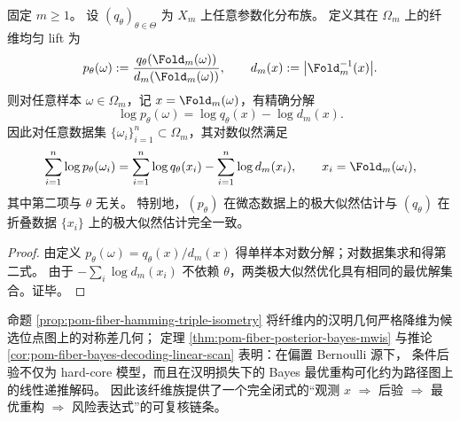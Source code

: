 \begin{proposition}\label{prop:pom-fiber-uniform-lift-mle-equivalence}
固定 \(m\ge 1\)。
设 \((q_\theta)_{\theta\in\Theta}\) 为 \(X_m\) 上任意参数化分布族。
定义其在 \(\Omega_m\) 上的纤维均匀 lift 为
\[
p_\theta(\omega):=\frac{q_\theta(\Fold_m(\omega))}{d_m(\Fold_m(\omega))},
\qquad
d_m(x):=\bigl|\Fold_m^{-1}(x)\bigr|.
\]
则对任意样本 \(\omega\in\Omega_m\)，记 \(x=\Fold_m(\omega)\)，有精确分解
\[
\log p_\theta(\omega)=\log q_\theta(x)-\log d_m(x).
\]
因此对任意数据集 \(\{\omega_i\}_{i=1}^n\subset\Omega_m\)，其对数似然满足
\[
\sum_{i=1}^n\log p_\theta(\omega_i)
=\sum_{i=1}^n\log q_\theta(x_i)-\sum_{i=1}^n\log d_m(x_i),
\qquad x_i=\Fold_m(\omega_i),
\]
其中第二项与 \(\theta\) 无关。
特别地，\((p_\theta)\) 在微态数据上的极大似然估计与 \((q_\theta)\) 在折叠数据 \(\{x_i\}\) 上的极大似然估计完全一致。
\end{proposition}
\begin{proof}
由定义 \(p_\theta(\omega)=q_\theta(x)/d_m(x)\) 得单样本对数分解；对数据集求和得第二式。
由于 \(-\sum_i\log d_m(x_i)\) 不依赖 \(\theta\)，两类极大似然优化具有相同的最优解集合。证毕。
\end{proof}

\begin{remark}[可解析后验推断的基准实例]\label{rem:pom-fiber-hardcore-bayes-baseline}
命题 \ref{prop:pom-fiber-hamming-triple-isometry} 将纤维内的汉明几何严格降维为候选位点图上的对称差几何；
定理 \ref{thm:pom-fiber-posterior-bayes-mwis} 与推论 \ref{cor:pom-fiber-bayes-decoding-linear-scan} 表明：在偏置 Bernoulli 源下，
条件后验不仅为 hard-core 模型，而且在汉明损失下的 Bayes 最优重构可化约为路径图上的线性递推解码。
因此该纤维族提供了一个完全闭式的“观测 \(x\) \(\Rightarrow\) 后验 \(\Rightarrow\) 最优重构 \(\Rightarrow\) 风险表达式”的可复核链条。
\end{remark}
